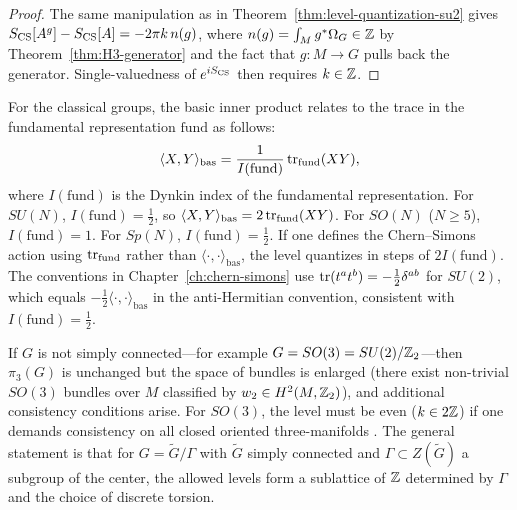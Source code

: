 \begin{proof}
The same manipulation as in Theorem~\ref{thm:level-quantization-su2} gives $S_{\operatorname{CS}}[A^g]-S_{\operatorname{CS}}[A] = -2\pi k\,n(g)$, where $n(g) = \int_M g^*\Omega_G \in \mathbb{Z}$ by Theorem~\ref{thm:H3-generator} and the fact that $g:M\to G$ pulls back the generator. Single-valuedness of $e^{iS_{\operatorname{CS}}}$ then requires $k\in \mathbb{Z}$.
\end{proof}

\begin{remark}\label{rem:appC-trace-conventions}
For the classical groups, the basic inner product relates to the trace in the fundamental representation $\mathrm{fund}$ as follows:
\begin{equation}\label{eq:appC-basic-vs-fund}
\langle X,Y\rangle_{\mathrm{bas}} = \frac{1}{I(\mathrm{fund})}\operatorname{tr}_{\mathrm{fund}}(XY),
\end{equation}
where $I(\mathrm{fund})$ is the Dynkin index of the fundamental representation. For $SU(N)$, $I(\mathrm{fund}) = \frac{1}{2}$, so $\langle X,Y\rangle_{\mathrm{bas}} = 2\operatorname{tr}_{\mathrm{fund}}(XY)$. For $SO(N)$ ($N\geq 5$), $I(\mathrm{fund}) = 1$. For $Sp(N)$, $I(\mathrm{fund}) = \frac{1}{2}$. If one defines the Chern--Simons action using $\operatorname{tr}_{\mathrm{fund}}$ rather than $\langle\cdot,\cdot\rangle_{\mathrm{bas}}$, the level quantizes in steps of $2I(\mathrm{fund})$. The conventions in Chapter~\ref{ch:chern-simons} use $\operatorname{tr}(t^at^b) = -\frac{1}{2}\delta^{ab}$ for $SU(2)$, which equals $-\frac{1}{2}\langle\cdot,\cdot\rangle_{\mathrm{bas}}$ in the anti-Hermitian convention, consistent with $I(\mathrm{fund}) = \frac{1}{2}$.
\end{remark}

\begin{remark}\label{rem:appC-non-simply-connected}
If $G$ is not simply connected---for example $G = SO(3) = SU(2)/\mathbb{Z}_2$---then $\pi_3(G)$ is unchanged but the space of bundles is enlarged (there exist non-trivial $SO(3)$ bundles over $M$ classified by $w_2\in H^2(M,\mathbb{Z}_2)$), and additional consistency conditions arise. For $SO(3)$, the level must be even ($k\in 2\mathbb{Z}$) if one demands consistency on all closed oriented three-manifolds \cite{DijkgraafWitten1990}. The general statement is that for $G = \tilde G/\Gamma$ with $\tilde G$ simply connected and $\Gamma\subset Z(\tilde G)$ a subgroup of the center, the allowed levels form a sublattice of $\mathbb{Z}$ determined by $\Gamma$ and the choice of discrete torsion.
\end{remark}

